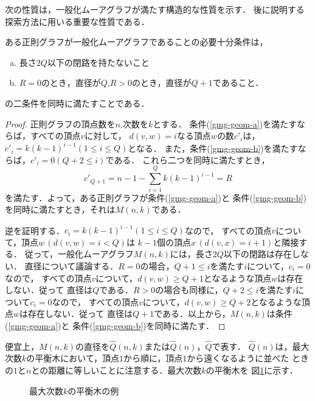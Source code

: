 次の性質は，一般化ムーアグラフが満たす構造的な性質を示す．
後に説明する探索方法に用いる重要な性質である．
\begin{theorem}\rm
  \label{thm:gmg-geometric-property}
  ある正則グラフが一般化ムーアグラフであることの必要十分条件は，
  \begin{enumerate}[(a)]
  \item 長さ$2Q$以下の閉路を持たないこと
    \label{gmg-geom-a}
  \item $R=0$のとき，直径が$Q$,\hspace{2ex}$R>0$のとき，直径が$Q+1$であること．
    \label{gmg-geom-b}
  \end{enumerate}
  の二条件を同時に満たすことである．
\end{theorem}
\begin{proof}\rm
  正則グラフの頂点数を$n$,次数を$k$とする．
  条件(\ref{gmg-geom-a})を満たすならば，すべての頂点$v$に対して，
  $d(v,w)=i$なる頂点$w$の数$c'_i$は，$c'_i=k(k-1)^{i-1}(1\leq i\leq Q)$となる．
  また，条件(\ref{gmg-geom-b})を満たすならば，$c'_i=0(Q+2\leq i)$である．
  これら二つを同時に満たすとき，
  \[ c'_{Q+1}=n-1-\sum_{i=1}^{Q}k(k-1)^{i-1}=R \]
  を満たす．よって，ある正則グラフが条件(\ref{gmg-geom-a})と
  条件(\ref{gmg-geom-b})を同時に満たすとき，それは$M(n,k)$である．

  逆を証明する．$c_i=k(k-1)^{i-1}(1\leq i\leq Q)$なので，
  すべての頂点$v$について，頂点$w\,(d(v,w)=i<Q)$は
  $k-1$個の頂点$x\,(d(v,x)=i+1)$と隣接する．
  従って，一般化ムーアグラフ$M(n,k)$には，長さ$2Q$以下の閉路は存在しない．
  直径について議論する．$R=0$の場合，$Q+1\leq i$を満たす$i$について，$c_i=0$なので，
  すべての頂点$v$について，$d(v,w)\geq Q+1$となるような頂点$w$は存在しない．従って
  直径は$Q$である．$R>0$の場合も同様に，$Q+2\leq i$を満たす$i$について$c_i=0$なので，
  すべての頂点$v$について，$d(v,w)\geq Q+2$となるような頂点$w$は存在しない．従って
  直径は$Q+1$である．以上から，$M(n,k)$は条件(\ref{gmg-geom-a})と
  条件(\ref{gmg-geom-b})を同時に満たす．
\end{proof}
便宜上，$M(n,k)$の直径を$\hat{Q}(n,k)$または$\hat{Q}(n)$，$\hat{Q}$で表す．
$\hat{Q}(n)$は，最大次数$k$の平衡木において，頂点$1$から順に，頂点$1$から遠くなるように並べた
ときの$1$と$n$との距離に等しいことに注意する．最大次数$k$の平衡木を
図\ref{fig:balanced-tree}に示す．
\begin{figure}
  \centering
  \def\svgwidth{.4\textwidth}
  
  \caption{最大次数$k$の平衡木の例}
  \label{fig:balanced-tree}
\end{figure}

